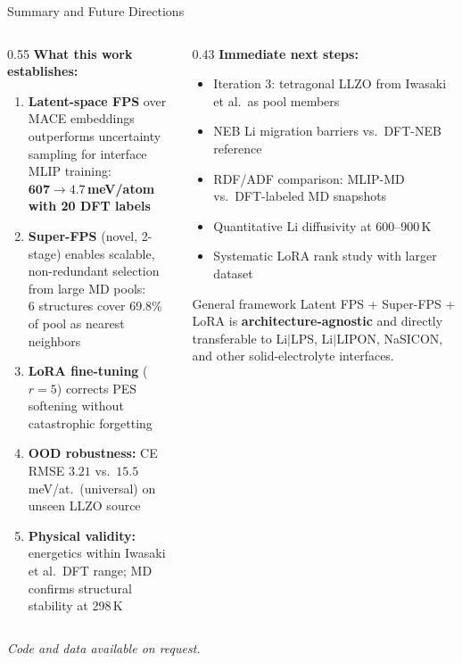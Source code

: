 \documentclass[aspectratio=169,10pt]{beamer}
\newcommand{\wintext}[1]{\textcolor{wincolor}{\textbf{#1}}}
\newcommand{\goldtext}[1]{\textcolor{iiscgold}{\textbf{#1}}}
\begin{document}
\begin{frame}{Summary and Future Directions}
\begin{columns}[T]
  \begin{column}{0.55\textwidth}
    \textbf{What this work establishes:}
    \begin{enumerate}
      \item \goldtext{Latent-space FPS} over MACE embeddings
        outperforms uncertainty sampling for interface MLIP training:\\
        \wintext{$\mathbf{607 \to 4.7}$\,meV/atom with 20 DFT labels}
      \item \goldtext{Super-FPS} (novel, 2-stage) enables scalable,
        non-redundant selection from large MD pools:\\
        6 structures cover 69.8\% of pool as nearest neighbors
      \item \goldtext{LoRA fine-tuning} ($r\!=\!5$) corrects PES softening
        without catastrophic forgetting
      \item \goldtext{OOD robustness:} CE RMSE $3.21$ vs.\ $15.5$\,meV/at.\
        (universal) on unseen LLZO source
      \item \goldtext{Physical validity:} energetics within Iwasaki et al.\
        DFT range; MD confirms structural stability at 298\,K
    \end{enumerate}
  \end{column}
  \begin{column}{0.43\textwidth}
    \textbf{Immediate next steps:}
    \begin{itemize}
      \item Iteration 3: tetragonal LLZO from Iwasaki et al.\ as pool members
      \item NEB Li migration barriers vs.\ DFT-NEB reference
      \item RDF/ADF comparison: MLIP-MD vs.\ DFT-labeled MD snapshots
      \item Quantitative Li diffusivity at 600--900\,K
      \item Systematic LoRA rank study with larger dataset
    \end{itemize}
    \vspace{0.5em}
    \begin{block}{General framework}
      {\small Latent FPS + Super-FPS + LoRA is
      \textbf{architecture-agnostic}
      and directly transferable to Li$|$LPS, Li$|$LIPON,
      NaSICON, and other solid-electrolyte interfaces.}
    \end{block}
  \end{column}
\end{columns}
\vspace{0.3em}
\begin{center}
  {\small\textit{Code and data available on request.}}
\end{center}
\end{frame}
\end{document}
